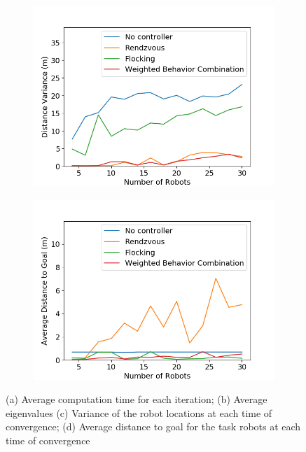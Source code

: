 \documentclass[../main.tex]{subfiles}
\begin{document}
\begin{figure}
\begin{subfigure}{0.49\textwidth}
\includegraphics[width=\textwidth]{img/new_dis_var.png}
\caption{}
\label{fig:dis_var}
\end{subfigure}
\begin{subfigure}{0.49\textwidth}
\includegraphics[width=\textwidth]{img/new_avg_dis.png}
\caption{}
\label{fig:avg_goal}
\end{subfigure}
\caption{(a) Average computation time for each iteration; (b) Average eigenvalues (c) Variance of the robot locations at each time of convergence; (d) Average distance to goal for the task robots at each time of convergence}
\label{fig:dis_goal}
\end{figure}
\end{document}
